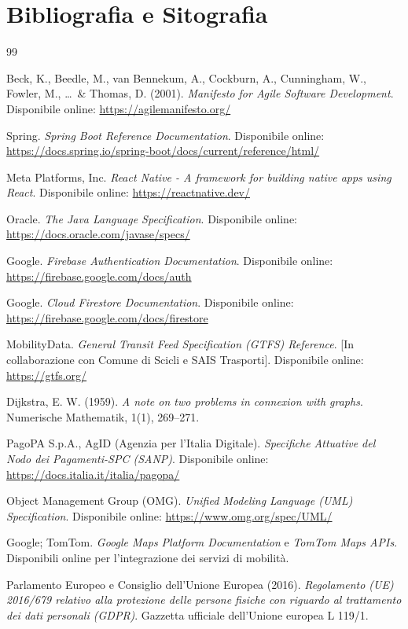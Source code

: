 \section*{Bibliografia e Sitografia}
\begin{thebibliography}{99}

Beck, K., Beedle, M., van Bennekum, A., Cockburn, A., Cunningham, W., Fowler, M., \dots\ \& Thomas, D. (2001).
\textit{Manifesto for Agile Software Development}.
Disponibile online: \url{https://agilemanifesto.org/}

Spring.
\textit{Spring Boot Reference Documentation}.
Disponibile online: \url{https://docs.spring.io/spring-boot/docs/current/reference/html/}

Meta Platforms, Inc.
\textit{React Native - A framework for building native apps using React}.
Disponibile online: \url{https://reactnative.dev/}

Oracle.
\textit{The Java Language Specification}.
Disponibile online: \url{https://docs.oracle.com/javase/specs/}

Google.
\textit{Firebase Authentication Documentation}.
Disponibile online: \url{https://firebase.google.com/docs/auth}

Google.
\textit{Cloud Firestore Documentation}.
Disponibile online: \url{https://firebase.google.com/docs/firestore}

MobilityData.
\textit{General Transit Feed Specification (GTFS) Reference}.
[In collaborazione con Comune di Scicli e SAIS Trasporti].
Disponibile online: \url{https://gtfs.org/}

Dijkstra, E. W. (1959).
\textit{A note on two problems in connexion with graphs}.
Numerische Mathematik, 1(1), 269--271.

PagoPA S.p.A., AgID (Agenzia per l'Italia Digitale).
\textit{Specifiche Attuative del Nodo dei Pagamenti-SPC (SANP)}.
Disponibile online: \url{https://docs.italia.it/italia/pagopa/}

Object Management Group (OMG).
\textit{Unified Modeling Language (UML) Specification}.
Disponibile online: \url{https://www.omg.org/spec/UML/}

Google; TomTom.
\textit{Google Maps Platform Documentation} e \textit{TomTom Maps APIs}.
Disponibili online per l'integrazione dei servizi di mobilit\`a.

Parlamento Europeo e Consiglio dell'Unione Europea (2016).
\textit{Regolamento (UE) 2016/679 relativo alla protezione delle persone fisiche con riguardo al trattamento dei dati personali (GDPR)}.
Gazzetta ufficiale dell'Unione europea L 119/1.

\end{thebibliography}